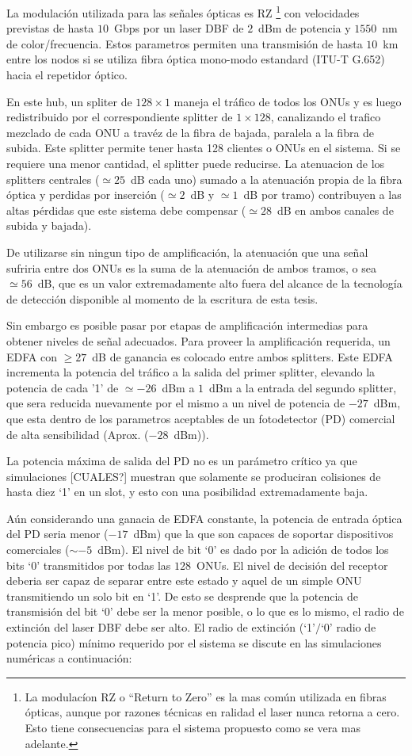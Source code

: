 La modulación utilizada para las señales ópticas es RZ \footnote{La modulacíon RZ o ``Return to Zero'' es la mas común utilizada en fibras ópticas, aunque por razones técnicas en ralidad el laser nunca retorna a cero. Esto tiene consecuencias para el sistema propuesto como se vera mas adelante.} con velocidades previstas de hasta $10$~Gbps por un laser DBF de $2$~dBm de potencia y $1550$~nm de color/frecuencia. Estos parametros permiten una transmisión de hasta $10$~km entre los nodos si se utiliza fibra óptica mono-modo estandard (ITU-T G.652) hacia el repetidor óptico.

En este hub, un spliter de $128\times 1$ maneja el tráfico de todos los ONUs y es luego redistribuido por el correspondiente splitter de $1\times 128$, canalizando el trafico mezclado de cada ONU a travéz de la fibra de bajada, paralela a la fibra de subida. Este splitter permite tener hasta 128 clientes o ONUs en el sistema. Si se requiere una menor cantidad, el splitter puede reducirse.
La atenuacion de los splitters centrales ($\simeq25$~dB cada uno) sumado a la atenuación propia de la fibra óptica y perdidas por inserción ($\simeq2$~dB y $\simeq1$~dB por tramo) contribuyen a las altas pérdidas que este sistema debe compensar ($\simeq28$~dB en ambos canales de subida y bajada).

De utilizarse sin ningun tipo de amplificación, la atenuación que una señal sufriria entre dos ONUs es la suma de la atenuación de ambos tramos, o sea $\simeq56$~dB, que es un valor extremadamente alto fuera del alcance de la tecnología de detección disponible al momento de la escritura de esta tesis.

Sin embargo es posible pasar por etapas de amplificación intermedias para obtener niveles de señal adecuados. Para proveer la amplificación requerida, un EDFA con $\geq27$~dB de ganancia es colocado entre ambos splitters. Este EDFA incrementa la potencia del tráfico a la salida del primer splitter, elevando la potencia de cada '1' de $\simeq-26$~dBm a $1$~dBm a la entrada del segundo splitter, que sera reducida nuevamente por el mismo a un nivel de potencia de $-27$~dBm, que esta dentro de los parametros aceptables de un fotodetector (PD) comercial de alta sensibilidad (Aprox. ($-28$~dBm)).

La potencia máxima de salida del PD no es un parámetro crítico ya que simulaciones [CUALES?] muestran que solamente se produciran colisiones de hasta diez `1' en un slot, y esto con una posibilidad extremadamente baja.

Aún considerando una ganacia de EDFA constante, la potencia de entrada óptica del PD seria menor ($-17$~dBm) que la que son capaces de soportar dispositivos comerciales ($\sim -5$~dBm).
El nivel de bit `0' es dado por la adición de todos los bits `0' transmitidos por todas las $128$~ONUs.
El nivel de decisión del receptor deberia ser capaz de separar entre este estado y aquel de un simple ONU transmitiendo un solo bit en `1'.
De esto se desprende que la potencia de transmisión del bit `0' debe ser la menor posible, o lo que es lo mismo, el radio de extinción del laser DBF debe ser alto.
El radio de extinción (`1'$/$`0' radio de potencia pico) mínimo requerido por el sistema se discute en las simulaciones numéricas a continuación:

